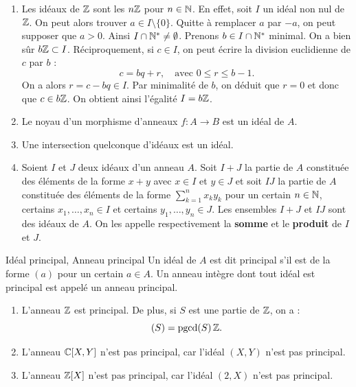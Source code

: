 \documentclass[]{report}
\begin{document}
\begin{ex}{}{}
    \begin{enumerate}
        \item Les idéaux de $\mathbb{Z}$ sont les $n\mathbb{Z}$ pour $n \in \mathbb{N}$. En effet, soit $I$ un idéal non nul de $\mathbb{Z}$. On peut alors trouver $a \in I \setminus \{0\}$. Quitte à remplacer $a$ par $-a$, on peut supposer que $a > 0$. Ainsi $I \cap \mathbb{N}^* \neq \emptyset$. Prenons $b \in I \cap \mathbb{N}^*$ minimal. On a bien sûr $b\mathbb{Z} \subset I$. Réciproquement, si $c \in I$, on peut écrire la division euclidienne de $c$ par $b$ :
        \[c = bq + r, \quad \text{avec } 0 \le r \le b - 1.\]
        On a alors $r = c - bq \in I$. Par minimalité de $b$, on déduit que $r = 0$ et donc que $c \in b\mathbb{Z}$. On obtient ainsi l'égalité $I = b\mathbb{Z}$.
        \item Le noyau d'un morphisme d'anneaux $f : A \rightarrow B$ est un idéal de $A$.
        \item Une intersection quelconque d'idéaux est un idéal.
        \item Soient $I$ et $J$ deux idéaux d'un anneau $A$. Soit $I + J$ la partie de $A$ constituée des éléments de la forme $x + y$ avec $x \in I$ et $y \in J$ et soit $IJ$ la partie de $A$ constituée des éléments de la forme $\sum_{k=1}^n x_k y_k$ pour un certain $n \in \mathbb{N}$, certains $x_1, \dots, x_n \in I$ et certains $y_1, \dots, y_n \in J$. Les ensembles $I + J$ et $IJ$ sont des idéaux de $A$. On les appelle respectivement la \textbf{somme} et le \textbf{produit} de $I$ et $J$.
    \end{enumerate}
\end{ex}

\begin{df}{Idéal principal, Anneau principal}{}
    Un idéal de $A$ est dit principal s'il est de la forme $(a)$ pour un certain $a \in A$. Un anneau intègre dont tout idéal est principal est appelé un anneau principal.
\end{df}

\begin{ex}{}{}
    \begin{enumerate}
        \item L'anneau $\mathbb{Z}$ est principal. De plus, si $S$ est une partie de $\mathbb{Z}$, on a :
        \[(S) = \text{pgcd}(S) \, \mathbb{Z}.\]
        \item L'anneau $\mathbb{C}[X, Y]$ n'est pas principal, car l'idéal $(X, Y)$ n'est pas principal.
        \item L'anneau $\mathbb{Z}[X]$ n'est pas principal, car l'idéal $(2, X)$ n'est pas principal.
    \end{enumerate}
\end{ex}
\end{document}
